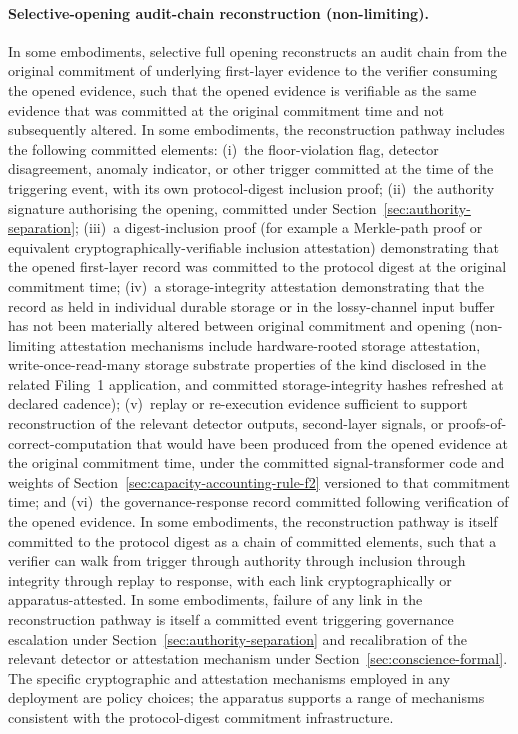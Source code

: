 \documentclass[a4paper,12pt]{article}
\begin{document}
\paragraph{Selective-opening audit-chain reconstruction
(non-limiting).}
In some embodiments, selective full opening reconstructs an audit
chain from the original commitment of underlying first-layer
evidence to the verifier consuming the opened evidence, such that
the opened evidence is verifiable as the same evidence that was
committed at the original commitment time and not subsequently
altered. In some embodiments, the reconstruction pathway includes
the following committed elements: (i)~the floor-violation flag,
detector disagreement, anomaly indicator, or other trigger committed
at the time of the triggering event, with its own protocol-digest
inclusion proof; (ii)~the authority signature authorising the
opening, committed under
Section~\ref{sec:authority-separation}; (iii)~a digest-inclusion
proof (for example a Merkle-path proof or equivalent
cryptographically-verifiable inclusion attestation) demonstrating
that the opened first-layer record was committed to the protocol
digest at the original commitment time; (iv)~a storage-integrity
attestation demonstrating that the record as held in individual
durable storage or in the lossy-channel input buffer has not been
materially altered between original commitment and opening
(non-limiting attestation mechanisms include hardware-rooted
storage attestation, write-once-read-many storage substrate
properties of the kind disclosed in the related Filing~1
application, and committed storage-integrity hashes refreshed at
declared cadence); (v)~replay or re-execution evidence sufficient to
support reconstruction of the relevant detector outputs, second-layer
signals, or proofs-of-correct-computation that would have been
produced from the opened evidence at the original commitment time,
under the committed signal-transformer code and weights of
Section~\ref{sec:capacity-accounting-rule-f2} versioned to that
commitment time; and (vi)~the governance-response record committed
following verification of the opened evidence. In some embodiments,
the reconstruction pathway is itself committed to the protocol
digest as a chain of committed elements, such that a verifier can
walk from trigger through authority through inclusion through
integrity through replay to response, with each link cryptographically
or apparatus-attested. In some embodiments, failure of any link in
the reconstruction pathway is itself a committed event triggering
governance escalation under
Section~\ref{sec:authority-separation} and recalibration of the
relevant detector or attestation mechanism under
Section~\ref{sec:conscience-formal}. The specific cryptographic and
attestation mechanisms employed in any deployment are policy
choices; the apparatus supports a range of mechanisms consistent
with the protocol-digest commitment infrastructure.
\end{document}
